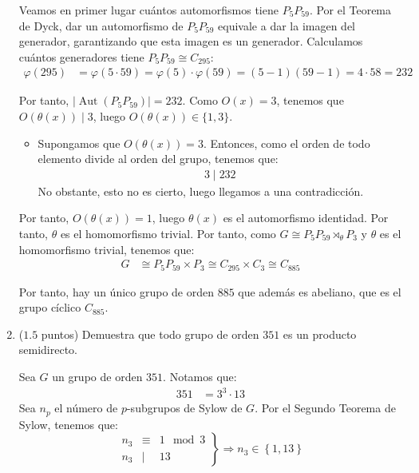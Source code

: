 \documentclass[12pt]{article}
\DeclareMathOperator{\Aut}{Aut}
\begin{document}
\begin{ejercicio}
\begin{enumerate}
            Veamos en primer lugar cuántos automorfismos tiene $P_5P_{59}$. Por el Teorema de Dyck, dar un automorfismo de $P_5P_{59}$ equivale a dar la imagen del generador, garantizando que esta imagen es un generador. Calculamos cuántos generadores tiene $P_5P_{59}\cong C_{295}$:
            \begin{align*}
                \varphi(295) & = \varphi(5\cdot 59) = \varphi(5)\cdot \varphi(59) = (5-1)(59-1) = 4\cdot 58 = 232
            \end{align*}

            Por tanto, $|\Aut(P_5P_{59})|=232$.
            Como $O(x)=3$, tenemos que $O(\theta(x))\mid 3$, luego $O(\theta(x))\in \{1,3\}$.
            \begin{itemize}
                \item Supongamos que $O(\theta(x))=3$. Entonces, como el orden de todo elemento divide al orden del grupo, tenemos que:
                \begin{align*}
                    3\mid 232
                \end{align*}
                No obstante, esto no es cierto, luego llegamos a una contradicción.
            \end{itemize}
            
            Por tanto, $O(\theta(x))=1$, luego $\theta(x)$ es el automorfismo identidad. Por tanto, $\theta$ es el homomorfismo trivial. Por tanto, como $G\cong P_5P_{59}\rtimes_{\theta}P_3$ y $\theta$ es el homomorfismo trivial, tenemos que:
            \begin{align*}
                G & \cong P_5P_{59} \times P_3 \cong C_{295} \times C_3\cong C_{885}
            \end{align*}

            Por tanto, hay un único grupo de orden $885$ que además es abeliano, que es el grupo cíclico $C_{885}$.
            
            \item ($1.5$ puntos) Demuestra que todo grupo de orden $351$ es un producto semidirecto.
            
            Sea $G$ un grupo de orden $351$. Notamos que:
            \begin{align*}
                351 & = 3^3\cdot 13
            \end{align*}
            Sea $n_p$ el número de $p$-subgrupos de Sylow de $G$. Por el Segundo Teorema de Sylow, tenemos que:
            \begin{equation*}
                \left.\begin{array}{rcl}
                    n_3 & \equiv & 1 \mod 3 \\
                    n_3 & \mid & 13
                \end{array}\right\}
                \Longrightarrow n_3 \in \left\{1,13\right\}
            \end{equation*}


\end{enumerate}
\end{ejercicio}
\end{document}
